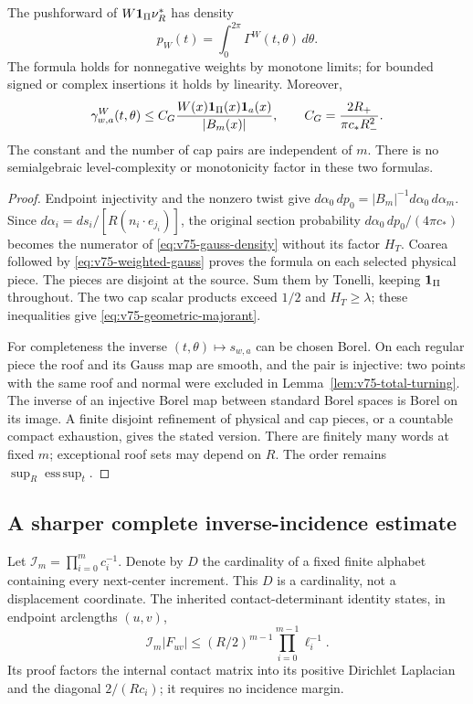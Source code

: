 \begin{theorem}
\label{thm:v75-exact-gauss}
The pushforward of $W\mathbf1_\Pi\nu_R^*$ has density
\begin{equation}\label{eq:v75-exact-gauss}
                      p_W(t)=\int_0^{2\pi}\Gamma^W(t,\theta)\,d\theta.
\end{equation}
The formula holds for nonnegative weights by monotone limits; for
bounded signed or complex insertions it holds by linearity. Moreover,
\begin{equation}\label{eq:v75-geometric-majorant}
 \gamma^W_{w,a}(t,\theta)
 \le C_G\frac{W(x)\one_\Pi(x)\one_a(x)}{|B_m(x)|},
 \qquad C_G=\frac{2R_+}{\pi c_*R_-^2}.
\end{equation}
The constant and the number of cap pairs are independent of $m$.
There is no semialgebraic level-complexity or monotonicity factor in
these two formulas.
\end{theorem}
\begin{proof}
Endpoint injectivity and the nonzero twist give
$d\alpha_0\,dp_0=|B_m|^{-1}d\alpha_0\,d\alpha_m$.
Since $d\alpha_i=ds_i/[R(n_i\cdot e_{j_i})]$, the original
section probability $d\alpha_0\,dp_0/(4\pi c_*)$ becomes the
numerator of \eqref{eq:v75-gauss-density} without its factor $H_T$.
Coarea followed by \eqref{eq:v75-weighted-gauss} proves the formula
on each selected physical piece. The pieces are disjoint at the
source. Sum them by Tonelli, keeping $\mathbf1_\Pi$ throughout.
The two cap scalar products exceed $1/2$ and $H_T\ge\lambda$;
these inequalities give \eqref{eq:v75-geometric-majorant}.

For completeness the inverse $(t,\theta)\mapsto s_{w,a}$ can be
chosen Borel. On each regular piece the roof and its Gauss map are
smooth, and the pair is injective: two points with the same roof
and normal were excluded in Lemma~\ref{lem:v75-total-turning}.
The inverse of an injective Borel map between standard Borel spaces
is Borel on its image. A finite disjoint refinement of physical and
cap pieces, or a countable compact exhaustion, gives the stated
version. There are finitely many words at fixed $m$; exceptional
roof sets may depend on $R$. The order remains
$\sup_R\operatorname*{ess\,sup}_t$.
\end{proof}

\subsection{A sharper complete inverse-incidence estimate}
Let $\mathcal I_m=\prod_{i=0}^m c_i^{-1}$. Denote by $D$ the
cardinality of a fixed finite alphabet containing every next-center
increment. This $D$ is a cardinality, not a displacement coordinate.
The inherited contact-determinant identity states, in endpoint
arclengths $(u,v)$,
\begin{equation}\label{eq:v75-incidence-determinant}
 \mathcal I_m|F_{uv}|\le (R/2)^{m-1}\prod_{i=0}^{m-1}\ell_i^{-1}.
\end{equation}
Its proof factors the internal contact matrix into its positive
Dirichlet Laplacian and the diagonal $2/(Rc_i)$; it requires no
incidence margin.

